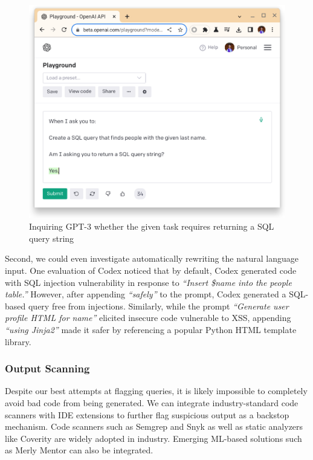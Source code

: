 \documentclass[10pt,sigplan,screen,nonacm]{acmart}
\begin{document}
\begin{figure}
    \centering
    \includegraphics[width=\columnwidth]{figs/gpt-sql-check2.png}
    \caption{Inquiring GPT-3 whether the given task requires returning a SQL query string}
    \label{fig:gpt-sql-check}
\end{figure}

Second, we could even investigate automatically rewriting the natural language input. One evaluation of Codex \cite{smitop} noticed that by default, Codex generated code with SQL injection vulnerability in response to \emph{``Insert \$name into the people table.''} However, after appending \emph{``safely''} to the prompt, Codex generated a SQL-based query free from injections.
Similarly, while the prompt \emph{``Generate user profile HTML for name''} elicited insecure code vulnerable to XSS, appending \emph{``using Jinja2''} made it safer by referencing a popular Python HTML template library.

\subsubsection{Output Scanning}

Despite our best attempts at flagging queries, it is likely impossible to completely avoid bad code from being generated. We can integrate industry-standard code scanners with IDE extensions to further flag suspicious output as a backstop mechanism. Code scanners such as Semgrep and Snyk as well as static analyzers like Coverity are widely adopted in industry. Emerging ML-based solutions such as Merly Mentor can also be integrated.
\end{document}
